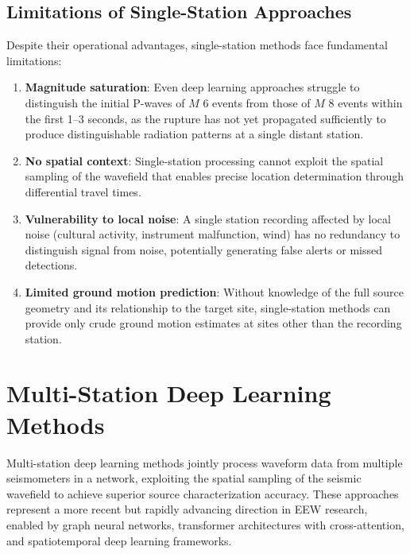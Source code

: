 \documentclass[review,authoryear]{elsarticle}
\begin{document}
\subsection{Limitations of Single-Station Approaches}

Despite their operational advantages, single-station methods face fundamental limitations:

\begin{enumerate}
\item \textbf{Magnitude saturation}: Even deep learning approaches struggle to distinguish the initial P-waves of $M$ 6 events from those of $M$ 8 events within the first 1--3 seconds, as the rupture has not yet propagated sufficiently to produce distinguishable radiation patterns at a single distant station.

\item \textbf{No spatial context}: Single-station processing cannot exploit the spatial sampling of the wavefield that enables precise location determination through differential travel times.

\item \textbf{Vulnerability to local noise}: A single station recording affected by local noise (cultural activity, instrument malfunction, wind) has no redundancy to distinguish signal from noise, potentially generating false alerts or missed detections.

\item \textbf{Limited ground motion prediction}: Without knowledge of the full source geometry and its relationship to the target site, single-station methods can provide only crude ground motion estimates at sites other than the recording station.
\end{enumerate}


\section{Multi-Station Deep Learning Methods}
\label{sec:multi_station}

Multi-station deep learning methods jointly process waveform data from multiple seismometers in a network, exploiting the spatial sampling of the seismic wavefield to achieve superior source characterization accuracy. These approaches represent a more recent but rapidly advancing direction in EEW research, enabled by graph neural networks, transformer architectures with cross-attention, and spatiotemporal deep learning frameworks.
\end{document}
